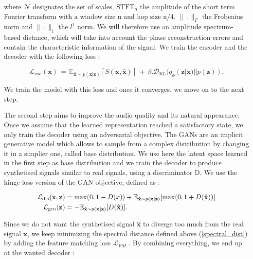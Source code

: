\documentclass{article}
\begin{document}
where $\mathcal{N}$ designates the set of scales, $\text{STFT}_n$ the amplitude of the short term Fourier transform with a window size n and hop size n/4, $\lVert \,.\, \rVert_F$ the Frobenius norm and $\lVert \,.\, \rVert_1$ the $l^1$ norm. We will therefore use an amplitude spectrum-based distance, which will take into account the phase reconstruction errors and contain the characteristic information of the signal.
We train the encoder and the decoder with the following loss :

\begin{equation}
    \mathcal{L}_{vae} (\textbf{x}) \,=\, \mathbb{E}_{\bm\hat{\textbf{x}} \sim p(\textbf{x}|\textbf{z})}[S(\textbf{x},\bm\hat {\textbf{x}})] \,+\, \beta . \mathcal{D}_{\text{KL}}(q_\phi (\textbf{z}|\textbf{x})||p(\textbf{z})).
\end{equation}

We train the model with this loss and once it converges, we move on to the next step.

The second step aims to improve the audio quality and its natural appearance. Once we assume that the learned representation reached a satisfactory state, we only train the decoder using an adversarial objective. The GANs are an implicit generative model which allows to sample from a complex distribution by changing it in a simplier one, called base distribution. We use here the latent space learned in the first step as base distribution and we train the decoder to produce synthetised signals similar to real signals, using a discriminator D. We use the hinge loss version of the GAN objective, defined as :



\begin{align}
    \mathcal{L}_{\text{dis}}(\textbf{x},\textbf{z}) &= \max(0, 1 - D(x)) + \mathbb{E}_{\bm\hat \textbf{x} \sim p(\textbf{x}|\textbf{z})}[\max(0, 1 + D(\bm\hat \textbf{x}))] \\
    \mathcal{L}_{\text{gen}}(\textbf{z}) &= -\mathbb{E}_{\bm\hat{ \textbf{x}} \sim p(\textbf{x}|\textbf{z})}[D(\bm\hat{ \textbf{x}})].
\end{align}

Since we do not want the synthetised signal $\bm\hat{\textbf{x}}$ to diverge too much from the real signal $\textbf{x}$, we keep minimizing the spectral distance defined above (\ref{spectral_dist}) by adding the feature matching loss $\mathcal{L}_{FM}$ \cite{kumarMelGANGenerativeAdversarial2019}. By combining everything, we end up at the wanted decoder :
\end{document}
